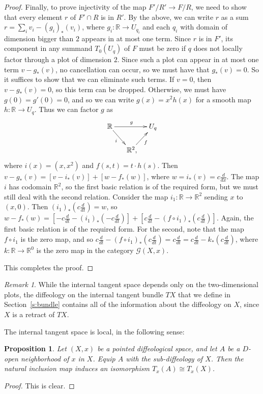 \documentclass[12pt]{amsart}
\newtheorem{prop}[de]{Proposition}
\theoremstyle{remark}
\newtheorem{rem}[de]{Remark}
\newcommand{\ra}{\to}
\newcommand{\cG}{{\mathcal{G}}}
\newcommand{\ddt}{{\textstyle\frac{d}{dt}}}
\def \R{\mathbb{R}}
\begin{document}
\begin{proof}
Finally, to prove injectivity of the map $F'/R' \to F/R$,
we need to show that every element $r$ of $F' \cap R$ is in $R'$.
By the above, we can write $r$ as a sum $r = \sum_i v_i - (g_i)_*(v_i)$,
where $g_i : \R \to U_{q_i}$ and each $q_i$ with domain of dimension
bigger than $2$ appears in at most one term.
Since $r$ is in $F'$, its component in any summand $T_0(U_q)$ of $F$
must be zero if $q$ does not locally factor through a plot of dimension $2$.
Since such a plot can appear in at most one term $v - g_*(v)$, no cancellation can
occur, so we must have that $g_*(v) = 0$.
So it suffices to show that we can eliminate such terms.
If $v = 0$, then $v - g_*(v) = 0$, so this term can be dropped.
Otherwise, we must have $g(0) = g'(0) = 0$, and so we can write
$g(x) = x^2 h(x)$ for a smooth map $h : \R \to U_q$.
Thus we can factor $g$ as
\[
  \xymatrix@C-10pt@R-6pt{ \R \ar[rr]^g \ar[dr]_-i && U_q \\ & \R^2 \ar[ur]_-f ,\!\!}
\]
where $i(x) = (x, x^2)$ and $f(s,t) = t \cdot h(s)$.
Then $v - g_*(v) = [v - i_*(v)] + [w - f_*(w)]$, where $w = i_*(v) = c \frac{d}{dx}$.
The map $i$ has codomain $\R^2$, so the first basic relation is of the
required form, but we must still deal with the second relation.
Consider the map $i_1 : \R \to \R^2$ sending $x$ to $(x,0)$.
Then $(i_1)_*(c \ddt) = w$, so
$w - f_*(w) = [-c\ddt - (i_1)_*(-c\ddt)] + [c\ddt - (f \circ i_1)_*(c \ddt)]$.
Again, the first basic relation is of the required form.
For the second, note that the map $f \circ i_1$ is the zero map, and so
$c \ddt - (f \circ i_1)_*(c \ddt) = c \ddt = c \ddt - k_*(c \ddt)$,
where $k : \R \ra \R^0$ is the zero map in the category $\cG(X,x)$.

This completes the proof.
\end{proof}

\begin{rem}
While the internal tangent space depends only on the two-dimensional plots, the
diffeology on the internal tangent bundle $TX$ that we define in Section~\ref{s:bundle}
contains all of the information about the diffeology on $X$, since $X$ is a retract of $TX$.
%
%
%
\end{rem}

The internal tangent space is local, in the following sense:

\begin{prop}\label{prop:internallocal}
Let $(X,x)$ be a pointed diffeological space,
and let $A$ be a $D$-open neighborhood of $x$ in $X$.
Equip $A$ with the sub-diffeology of $X$.
Then the natural inclusion map induces an isomorphism $T_x(A) \cong T_x(X)$.
\end{prop}
\begin{proof}
This is clear.
\end{proof}
\end{document}
